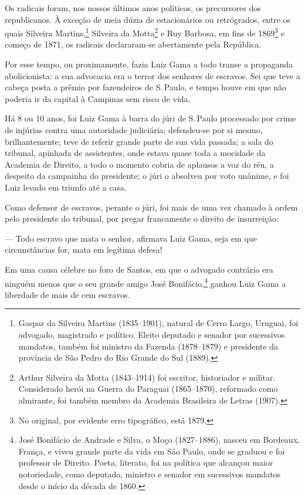 Os radicais foram, nos nossos últimos anos políticos, os precursores dos
republicanos. À exceção de meia dúzia de estacionários ou retrógrados,
entre os quais Silveira Martins,\footnote{Gaspar da Silveira Martins
  (1835--1901), natural de Cerro Largo, Uruguai, foi advogado, magistrado
  e político. Eleito deputado e senador por sucessivos mandatos, também
  foi ministro da Fazenda (1878--1879) e presidente da província de São
  Pedro do Rio Grande do Sul (1889).} Silveira da Motta\footnote{
  Arthur Silveira da Motta (1843--1914) foi escritor, historiador e
  militar. Considerado herói na Guerra do Paraguai (1865--1870),
  reformado como almirante, foi também membro da Academia Brasileira de
  Letras (1907).} e Ruy Barbosa, em fins de 1869\footnote{No original,
  por evidente erro tipográfico, está 1879.} e começo de 1871, os
radicais declararam-se abertamente pela República.

Por esse tempo, ou proximamente, fazia Luiz Gama a todo transe a
propaganda abolicionista: a sua advocacia era o terror dos senhores de
escravos. Sei que teve a cabeça posta a prêmio por fazendeiros de S.\,Paulo, e tempo houve em que não poderia ir da capital à Campinas sem
risco de vida.

Há 8 ou 10 anos, foi Luiz Gama à barra do júri de S.\,Paulo processado
por crime de injúrias contra uma autoridade judiciária; defendeu-se por
si mesmo, brilhantemente; teve de referir grande parte de sua vida
passada; a sala do tribunal, apinhada de assistentes, onde estava quase
toda a mocidade da Academia de Direito, a todo o momento cobria de
aplausos a voz do réu, a despeito da campainha do presidente; o júri o
absolveu por voto unânime, e foi Luiz levado em triunfo até a casa.

Como defensor de escravos, perante o júri, foi mais de uma vez chamado à
ordem pelo presidente do tribunal, por pregar francamente o direito de
insurreição:

--- Todo escravo que mata o senhor, afirmava Luiz Gama, seja em que
circunstâncias for, mata em legítima defesa!

Em uma causa célebre no foro de Santos, em que o advogado contrário era
ninguém menos que o seu grande amigo José Bonifácio,\footnote{José \label{bonifacio}
  Bonifácio de Andrade e Silva, o Moço (1827--1886), nasceu em Bordeaux,
  França, e viveu grande parte da vida em São Paulo, onde se graduou e
  foi professor de Direito. Poeta, literato, foi na política que
  alcançou maior notoriedade, como deputado, ministro e senador em
  sucessivos mandatos desde o início da década de 1860.} ganhou Luiz
Gama a liberdade de mais de cem escravos.

